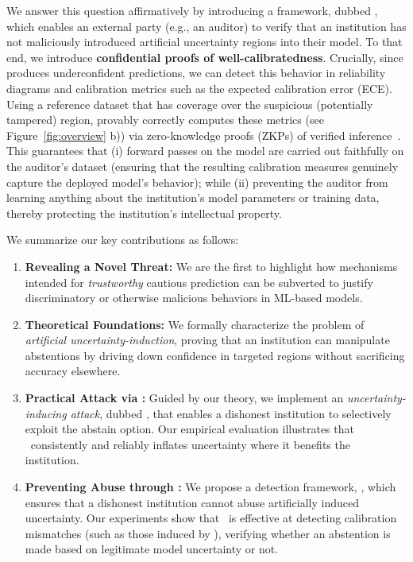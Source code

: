 We answer this question affirmatively by introducing a framework, dubbed \name, which enables an external party (e.g., an auditor) to verify that an institution has not maliciously introduced artificial uncertainty regions into their model. To that end, we introduce \textbf{confidential proofs of well-calibratedness}. Crucially, since \attack produces underconfident predictions, we can detect this behavior in reliability diagrams and calibration metrics such as the expected calibration error (ECE). Using a reference dataset that has coverage over the suspicious (potentially tampered) region, \name provably correctly computes these metrics (see Figure~\ref{fig:overview} b)) via zero-knowledge proofs (ZKPs) of verified inference~\citep{weng2021mystique, sun2024zkllm}. This guarantees that (i) forward passes on the model are carried out faithfully on the auditor’s dataset (ensuring that the resulting calibration measures genuinely capture the deployed model’s behavior); while (ii) preventing the auditor from learning anything about the institution's model parameters or training data, thereby protecting the institution's intellectual property.

We summarize our key contributions as follows:
\begin{enumerate}
    \item \textbf{Revealing a Novel Threat:} We are the first to highlight how mechanisms intended for \emph{trustworthy} cautious prediction can be subverted to justify discriminatory or otherwise malicious behaviors in ML-based models.
    \item \textbf{Theoretical Foundations:} We formally characterize the problem of \emph{artificial uncertainty-induction}, proving that an institution can manipulate abstentions by driving down confidence in targeted regions without sacrificing accuracy elsewhere.
    \item \textbf{Practical Attack via \attack:} Guided by our theory, we implement an \emph{uncertainty-inducing attack}, dubbed \attack, that enables a dishonest institution to selectively exploit the abstain option. Our empirical evaluation illustrates that \attack~consistently and reliably inflates uncertainty where it benefits the institution.
    \item \textbf{Preventing Abuse through \name:} We propose a detection framework, \name, which ensures that a dishonest institution cannot abuse artificially induced uncertainty. Our experiments show that \name\ is effective at detecting calibration mismatches (such as those induced by \attack), verifying whether an abstention is made based on legitimate model uncertainty or not.
\end{enumerate}

